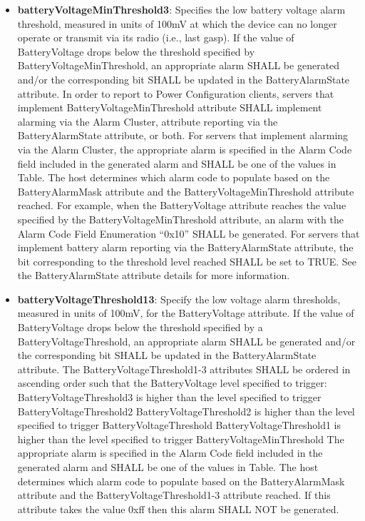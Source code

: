 \begin{itemize}
\item \textbf{batteryVoltageMinThreshold3}: Specifies the low battery voltage alarm threshold, measured in units of 100mV at which the device can no longer operate or transmit via its radio (i.e., last gasp). If the value of BatteryVoltage drops below the threshold specified by BatteryVoltageMinThreshold, an appropriate alarm SHALL be generated and/or the corresponding bit SHALL be updated in the BatteryAlarmState attribute. In order to report to Power Configuration clients, servers that implement BatteryVoltageMinThreshold attribute SHALL implement alarming via the Alarm Cluster, attribute reporting via the BatteryAlarmState attribute, or both. For servers that implement alarming via the Alarm Cluster, the appropriate alarm is specified in the Alarm Code field included in the generated alarm and SHALL be one of the values in Table. The host determines which alarm code to populate based on the BatteryAlarmMask attribute and the BatteryVoltageMinThreshold attribute reached. For example, when the BatteryVoltage attribute reaches the value specified by the BatteryVoltageMinThreshold attribute, an alarm with the Alarm Code Field Enumeration “0x10” SHALL be generated. For servers that implement battery alarm reporting via the BatteryAlarmState attribute, the bit corresponding to the threshold level reached SHALL be set to TRUE. See the BatteryAlarmState attribute details for more information.
\item \textbf{batteryVoltageThreshold13}: Specify the low voltage alarm thresholds, measured in units of 100mV, for the BatteryVoltage attribute. If the value of BatteryVoltage drops below the threshold specified by a BatteryVoltageThreshold, an appropriate alarm SHALL be generated and/or the corresponding bit SHALL be updated in the BatteryAlarmState attribute. The BatteryVoltageThreshold1-3 attributes SHALL be ordered in ascending order such that the BatteryVoltage level specified to trigger: BatteryVoltageThreshold3 is higher than the level specified to trigger BatteryVoltageThreshold2 BatteryVoltageThreshold2 is higher than the level specified to trigger BatteryVoltageThreshold BatteryVoltageThreshold1 is higher than the level specified to trigger BatteryVoltageMinThreshold The appropriate alarm is specified in the Alarm Code field included in the generated alarm and SHALL be one of the values in Table. The host determines which alarm code to populate based on the BatteryAlarmMask attribute and the BatteryVoltageThreshold1-3 attribute reached. If this attribute takes the value 0xff then this alarm SHALL NOT be generated.

\end{itemize}
